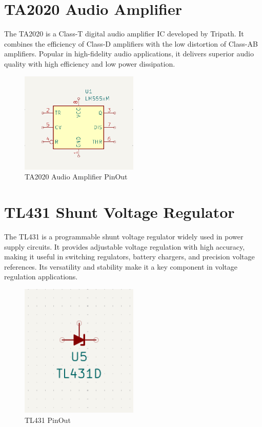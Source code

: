 \documentclass{article}
\begin{document}
\section{TA2020 Audio Amplifier}
The TA2020 is a Class-T digital audio amplifier IC developed by Tripath. It combines the efficiency of Class-D amplifiers with the low distortion of Class-AB amplifiers. Popular in high-fidelity audio applications, it delivers superior audio quality with high efficiency and low power dissipation.
\begin{figure}[H]
    \centering
    \includegraphics[width=0.5\textwidth]{img/LM555.png}
    \caption{TA2020 Audio Amplifier PinOut}
    \label{fig:TA2020}
\end{figure}

\section{TL431 Shunt Voltage Regulator}
The TL431 is a programmable shunt voltage regulator widely used in power supply circuits. It provides adjustable voltage regulation with high accuracy, making it useful in switching regulators, battery chargers, and precision voltage references. Its versatility and stability make it a key component in voltage regulation applications.
\begin{figure}[H]
    \centering
    \includegraphics[width=0.5\textwidth]{img/TL431.png}
    \caption{TL431 PinOut}
    \label{fig:TL431}
\end{figure}
\end{document}
